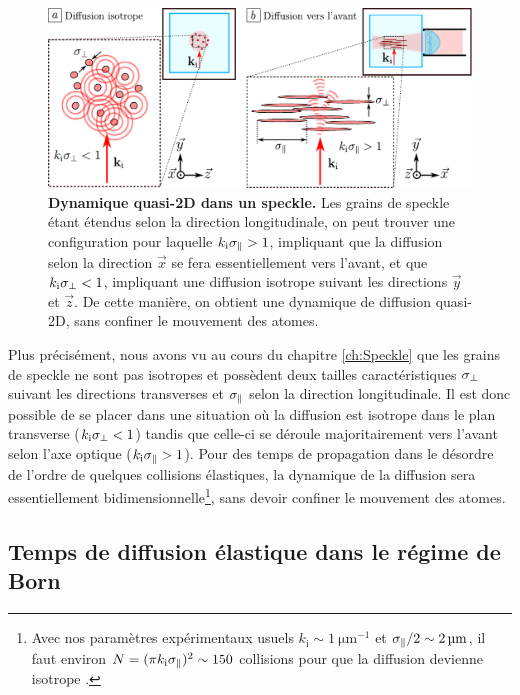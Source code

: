 \begin{figure}
\centering
\includegraphics[width=\textwidth]{Fig/TauS_PRL/desordre_2D.pdf}
\caption{\textbf{Dynamique quasi-2D dans un speckle.} Les grains de speckle étant étendus selon la direction longitudinale, on peut trouver une configuration pour laquelle $k_{\mathrm{i}}\sigma_{\parallel}>1$, impliquant que la diffusion selon la direction $\vec{x}$ se fera essentiellement vers l'avant, et que $k_{\mathrm{i}}\sigma_{\perp}<1$, impliquant une diffusion isotrope suivant les directions $\vec{y}$ et $\vec{z}$. De cette manière, on obtient une dynamique de diffusion quasi-2D, sans confiner le mouvement des atomes.}
\label{fig:desordre_2D}
\end{figure}

Plus précisément, nous avons vu au cours du chapitre \ref{ch:Speckle} que les grains de speckle ne sont pas isotropes et possèdent deux tailles caractéristiques $\sigma_{\perp}$ suivant les directions transverses et $\sigma_{\parallel}$ selon la direction longitudinale. Il est donc possible de se placer dans une situation où la diffusion est isotrope dans le plan transverse ($k_{\mathrm{i}}\sigma_{\perp}<1$) tandis que celle-ci se déroule majoritairement vers l'avant selon l'axe optique ($k_{\mathrm{i}}\sigma_{\parallel}>1$). Pour des temps de propagation dans le désordre de l'ordre de quelques collisions élastiques, la dynamique de la diffusion sera essentiellement bidimensionnelle\footnote{Avec nos paramètres expérimentaux usuels $k_{\mathrm{i}}\sim\SI{1}{\micro\metre^{-1}}$ et $\sigma_{\parallel}/2\sim\SI{2}{\micro\metre}$, il faut environ $N=(\pi k_{\mathrm{i}} \sigma_{\parallel})^2 \sim 150$ collisions pour que la diffusion devienne isotrope \citep{denechaud2018vers}.}, sans devoir confiner le mouvement des atomes.


\subsection{Temps de diffusion élastique dans le régime de Born}

